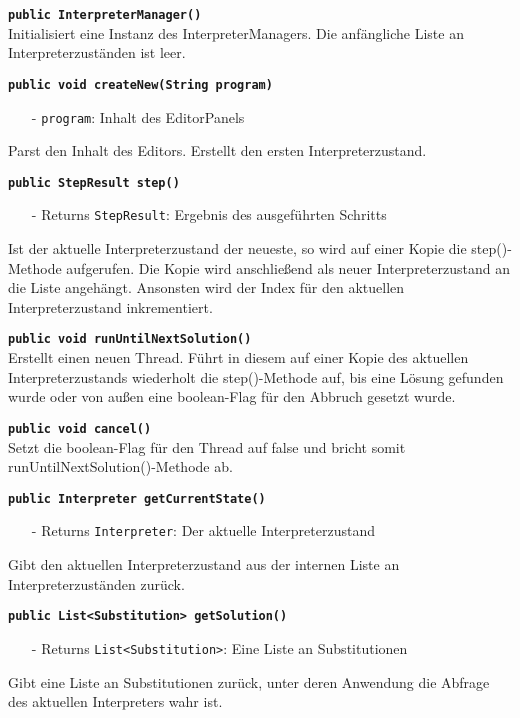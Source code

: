 \documentclass[parskip=full,11pt,twoside]{scrartcl}
\begin{document}
\textbf{\texttt{public InterpreterManager()}}\\
Initialisiert eine Instanz des InterpreterManagers. Die anfängliche Liste an Interpreterzuständen ist leer.

\textbf{\texttt{public void createNew(String program)}}
\begin{itemize}[noitemsep]
	\item[-] \texttt{program}: Inhalt des EditorPanels
\end{itemize}
Parst den Inhalt des Editors. Erstellt den ersten Interpreterzustand.

\textbf{\texttt{public StepResult step()}}
\begin{itemize}[noitemsep]
    \item[-] Returns \texttt{StepResult}: Ergebnis des ausgeführten Schritts
\end{itemize}
Ist der aktuelle Interpreterzustand der neueste, so wird auf einer Kopie die step()-Methode aufgerufen. Die Kopie wird anschließend als neuer Interpreterzustand an die Liste angehängt. Ansonsten wird der Index für den aktuellen Interpreterzustand inkrementiert.

\textbf{\texttt{public void runUntilNextSolution()}}\\
Erstellt einen neuen Thread. Führt in diesem auf einer Kopie des aktuellen Interpreterzustands wiederholt die step()-Methode auf, bis eine Lösung gefunden wurde oder von außen eine boolean-Flag für den Abbruch gesetzt wurde.

\textbf{\texttt{public void cancel()}}\\
Setzt die boolean-Flag für den Thread auf false und bricht somit runUntilNextSolution()-Methode ab. 

\textbf{\texttt{public Interpreter getCurrentState()}}
\begin{itemize}[noitemsep]
    \item[-] Returns \texttt{Interpreter}: Der aktuelle Interpreterzustand
\end{itemize}
Gibt den aktuellen Interpreterzustand aus der internen Liste an Interpreterzuständen zurück.

\textbf{\texttt{public List<Substitution> getSolution()}}
\begin{itemize}[noitemsep]
    \item[-] Returns \texttt{List<Substitution>}: Eine Liste an Substitutionen
\end{itemize}
Gibt eine Liste an Substitutionen zurück, unter deren Anwendung die Abfrage des aktuellen Interpreters wahr ist.
\end{document}
